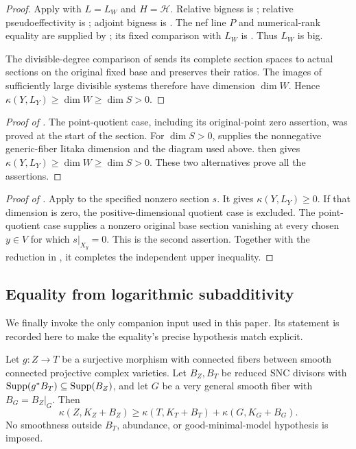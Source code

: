 \begin{proof}
Apply  with $L=L_W$ and
$H=\mathcal H$. Relative bigness is
; relative pseudoeffectivity is
; adjoint bigness is
. The nef line $P$ and numerical-rank equality
are supplied by ; its fixed comparison with $L_W$
is . Thus $L_W$ is big.

The divisible-degree comparison of  sends its
complete section spaces to actual sections on the original fixed base
and preserves their ratios. The images of sufficiently large divisible
systems therefore have dimension $\dim W$. Hence
$\kappa(Y,L_Y)\geq\dim W\geq\dim S>0$.
\end{proof}

\begin{proof}[Proof of ]
The point-quotient case, including its original-point zero assertion,
was proved at the start of the section.  For $\dim S>0$,
 supplies the nonnegative
generic-fiber Iitaka dimension and the diagram used above.
 then gives
$\kappa(Y,L_Y)\ge\dim W\ge\dim S>0$.  These two alternatives prove
all the assertions.
\end{proof}

\begin{proof}[Proof of ]
Apply  to the specified nonzero section $s$.
It gives $\kappa(Y,L_Y)\geq0$. If that dimension is zero, the
positive-dimensional quotient case is excluded. The point-quotient
case supplies a nonzero original base section vanishing at every
chosen $y\in V$ for which $s|_{X_y}=0$. This is the second assertion.
Together with the reduction in , it completes the
independent upper inequality.
\end{proof}

\subsection{Equality from logarithmic subadditivity}
\label{sec:matched-equality}

We finally invoke the only companion input used in this paper. Its
statement is recorded here to make the equality's precise hypothesis
match explicit.

\begin{theorem}
\label{thm:log-iitaka}
Let $g\colon Z\to T$ be a surjective morphism with connected fibers between
smooth connected projective complex varieties. Let $B_Z,B_T$ be reduced
SNC divisors with
$\operatorname{Supp}(g^*B_T)\subseteq\operatorname{Supp}(B_Z)$, and let
$G$ be a very general smooth fiber with $B_G=B_Z|_G$. Then
\begin{equation}\label{eq:lower-bound}
 \kappa(Z,K_Z+B_Z)
 \geq \kappa(T,K_T+B_T)+\kappa(G,K_G+B_G).
\end{equation}
No smoothness outside $B_T$, abundance, or good-minimal-model hypothesis
is imposed.
\end{theorem}

